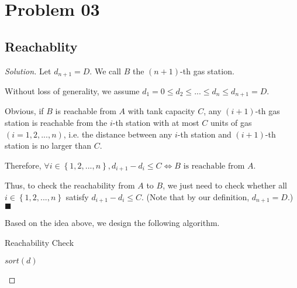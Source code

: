 \documentclass{article}
\renewcommand{\qedsymbol}{\hfill $\blacksquare$\par}
\newcommand{\set}[1]{\left\{#1\right\}}
\newenvironment{solution}{\begin{proof}[\noindent\it Solution]}{\end{proof}}
\begin{document}
\newpage
\vspace{1em}
\section{Problem 03}
\vspace{1em}
\subsection{Reachablity}
\vspace{1em}
\begin{solution}
    Let $d_{n+1}=D.$ We call $B$ the $(n+1)$-th gas station.
    
    \hspace{2.6em} Without loss of generality, we assume $d_1=0\le d_2 \le ...\le d_n \le d_{n+1}=D.$ 
    
    \hspace{2.6em}
    Obvious, if $B$ is reachable from $A$ with tank capacity $C$, any $(i+1)$-th gas station is reachable from the $i$-th station with at most $C$ units of gas $(i=1,2,...,n)$, i.e. the distance between any $i$-th station and $(i+1)$-th station is no larger than $C$.
    
    \hspace{2.6em}
    Therefore, $\forall i\in\set{1,2,...,n}, d_{i+1}-d_i\le C \Longleftrightarrow B\text{ is reachable from }A$.
    
    \hspace{2.6em}
    Thus, to check the reachability from $A$ to $B$, we just need to check whether all $i\in\set{1,2,...,n}$ satisfy $d_{i+1}-d_i\le C$. (Note that by our definition, $d_{n+1}=D$.) \qedsymbol
    
    \vspace{3em} \hspace{2.6em}
    Based on the idea above, we design the following algorithm.
    
    \begin{algorithm}
        \caption{Reachability Check}
        
	    {
	        $sort(d)$\;
	        \BlankLine
	        \BlankLine
	        {
	        }
	   }
    \end{algorithm}
    

\end{solution}
\end{document}
